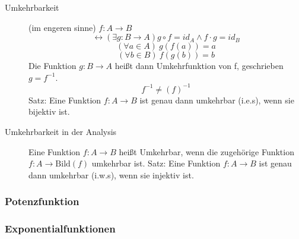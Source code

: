 \begin{description}
    \item[Umkehrbarkeit] (im engeren sinne) $f : A \longrightarrow B$
    \[\leftrightarrow (\exists g : B \longrightarrow A) g \circ f = id_A \wedge f \cdot g = id_B\]
    \[(\forall a \in A)\ g(f(a)) = a\]
    \[(\forall b \in B)\ f(g(b)) = b\]
    Die Funktion $g : B \longrightarrow A$ heißt dann Umkehrfunktion von f, geschrieben $g = f^{-1}$.
    \[f^{-1} \not = (f)^{-1}\]
    Satz: Eine Funktion $f : A \longrightarrow B$ ist genau dann umkehrbar (i.e.s), wenn sie bijektiv ist.
    \item[Umkehrbarkeit in der Analysis] Eine Funktion $f : A \longrightarrow B$ heißt Umkehrbar, wenn die zugehörige Funktion $f : A \longrightarrow \textrm{Bild}(f)$ umkehrbar ist.
    Satz: Eine Funktion $f : A \longrightarrow B$ ist genau dann umkehrbar (i.w.s), wenn sie injektiv ist.
\end{description}

\subsubsection{Potenzfunktion}


\subsubsection{Exponentialfunktionen}


